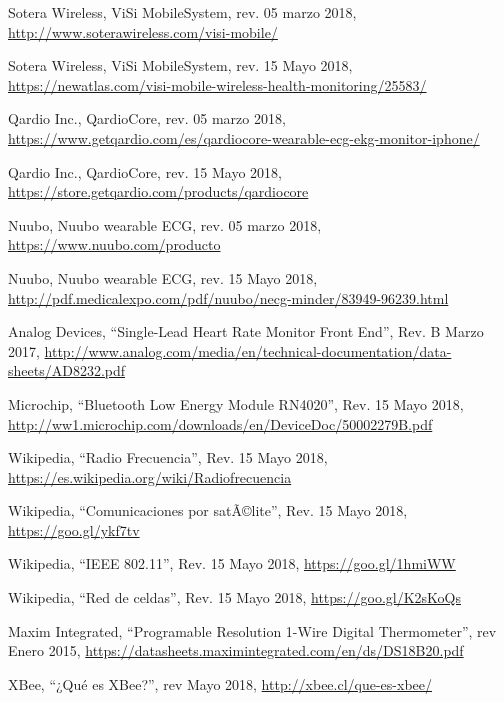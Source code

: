 \renewcommand{\refname}{Referencias}
\begin{thebibliography}{99}

 Sotera Wireless, ViSi Mobile\textregistered  System, rev. 05 marzo 2018, \hyperref[visi]{http://www.soterawireless.com/visi-mobile/}

 Sotera Wireless, ViSi Mobile\textregistered  System, rev. 15 Mayo 2018, \hyperref[visi_tel]{https://newatlas.com/visi-mobile-wireless-health-monitoring/25583/}

 Qardio Inc., QardioCore, rev.  05 marzo 2018, \hyperref[qardio]{https://www.getqardio.com/es/qardiocore-wearable-ecg-ekg-monitor-iphone/}

 Qardio Inc., QardioCore, rev.  15 Mayo 2018,
\hyperref[qardio_tel]{https://store.getqardio.com/products/qardiocore}

 Nuubo, Nuubo wearable ECG, rev. 05 marzo 2018, \hyperref[nuubo]{https://www.nuubo.com/producto}

 Nuubo, Nuubo wearable ECG, rev. 15 Mayo 2018, \hyperref[nuubo_tel]{http://pdf.medicalexpo.com/pdf/nuubo/necg-minder/83949-96239.html}

 Analog Devices, ``Single-Lead Heart Rate Monitor Front End'', Rev. B Marzo 2017, \hyperref[ad8232]{http://www.analog.com/media/en/technical-documentation/data-sheets/AD8232.pdf}

 Microchip, ``Bluetooth Low Energy Module RN4020'', Rev. 15 Mayo 2018, \hyperref[RN4020]{http://ww1.microchip.com/downloads/en/DeviceDoc/50002279B.pdf}

 Wikipedia, ``Radio Frecuencia'', Rev. 15 Mayo 2018, \hyperref[RF]{https://es.wikipedia.org/wiki/Radiofrecuencia}

 Wikipedia, ``Comunicaciones por satÃ©lite'', Rev. 15 Mayo 2018, \hyperref[satelite]{https://goo.gl/ykf7tv}

 Wikipedia, ``IEEE 802.11'', Rev. 15 Mayo 2018, \hyperref[wifi]{https://goo.gl/1hmiWW}

 Wikipedia, ``Red de celdas'', Rev. 15 Mayo 2018, \hyperref[celular]{https://goo.gl/K2sKoQs}

 Maxim Integrated, ``Programable Resolution 1-Wire Digital Thermometer'', rev Enero 2015, \hyperref[temp]{https://datasheets.maximintegrated.com/en/ds/DS18B20.pdf}

 XBee, ``¿Qué es XBee?'', rev Mayo 2018, \hyperref[xbee_info]{http://xbee.cl/que-es-xbee/}


\end{thebibliography}
